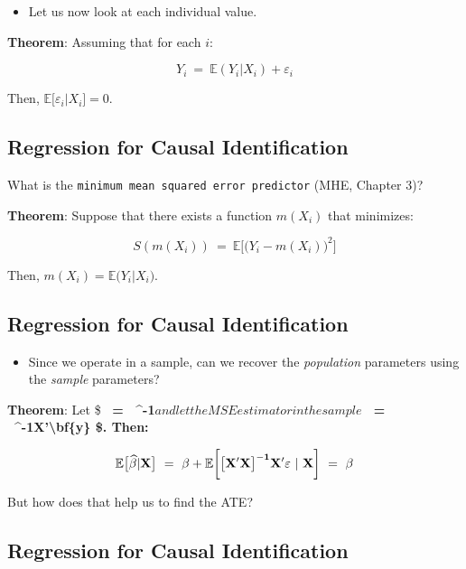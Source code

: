 \documentclass[11pt]{article}
\providecommand{\tightlist}{%
      \setlength{\itemsep}{0pt}\setlength{\parskip}{0pt}}
\begin{document}
\begin{itemize}
\tightlist
\item
  Let us now look at each individual value.
\end{itemize}

\textbf{Theorem}: Assuming that for each \(i\):

\[ Y_i \ = \ \mathbb{E}(Y_i|X_i) + \varepsilon_i \]

Then, \(\mathbb{E}\big[\varepsilon_i|X_i\big] = 0\).

    \hypertarget{regression-for-causal-identification}{%
\subsection{Regression for Causal
Identification}\label{regression-for-causal-identification}}

What is the \texttt{minimum\ mean\ squared\ error\ predictor} (MHE,
Chapter 3)?

\textbf{Theorem}: Suppose that there exists a function \(m(X_i)\) that
minimizes:

\[ S(m(X_i)) \ = \ \mathbb{E}\bigg[\big(Y_i - m(X_i)\big)^2\bigg] \]

Then, \(m(X_i) = \mathbb{E}\big(Y_i|X_i\big)\).

    \hypertarget{regression-for-causal-identification}{%
\subsection{Regression for Causal
Identification}\label{regression-for-causal-identification}}

\begin{itemize}
\tightlist
\item
  Since we operate in a sample, can we recover the \emph{population}
  parameters using the \emph{sample} parameters?
\end{itemize}

\textbf{Theorem}: Let
\$\bf{\beta} \ = \ \big[\bf{X}'\bf{X}\big]^{-1}\big[\bf{X}'\bf{y}\big] $ and let the MSE estimator in the sample $\widehat{\bf{\beta}} \ = \ \big[\bf{X}'\bf{X}\big]^{-1}\bf{X}'\textbackslash bf\{y\}
\$. Then:

\[ \mathbb{E}\big[\widehat{\bf{\beta}} | \bf{X}\big] \ = \ \bf{\beta} + \mathbb{E}\bigg[ \big[\bf{X}'\bf{X}\big]^{-1}\bf{X}'\bf{\varepsilon} \ | \ \bf{X}\bigg] \ = \ \bf{\beta}\]

But how does that help us to find the ATE?

    \hypertarget{regression-for-causal-identification}{%
\subsection{Regression for Causal
Identification}\label{regression-for-causal-identification}}
\end{document}
